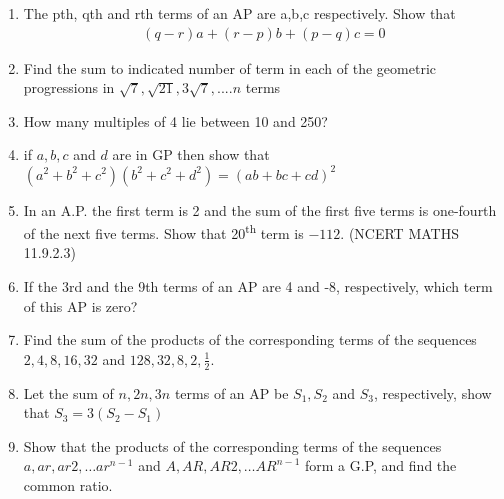 \begin{enumerate}[label=\thesection.\arabic*,ref=\thesection.\theenumi]
\item The pth, qth and rth terms of an AP are a,b,c respectively. Show that
\begin{align*} (q-r)a + (r-p)b +(p-q)c =0 \end{align*}
\solution

\pagebreak

\item Find the sum to indicated number of term in each of the geometric progressions in $\sqrt{7} ,\sqrt{21} , 3\sqrt{7}, ....n$ terms\\
\solution


\item How many multiples of 4 lie between 10 and 250?\\
\solution

\pagebreak

\item if $a,b,c$ and $d$ are in GP then show that $(a^{2}+b^{2}+c^{2})(b^{2}+c^{2}+d^{2})=(ab+bc+cd)^{2}$\\
\solution
\pagebreak

\item In an A.P. the first term is 2 and the sum of the first five terms is one-fourth of the next five terms. Show that 20\textsuperscript{th} term is $-112$. \hfill(NCERT MATHS 11.9.2.3)\\
\solution

\pagebreak
\item If the 3rd and the 9th terms of an AP are 4 and -8, respectively, which term of this AP is zero? \\
\solution

\pagebreak
\item Find the sum of the products of the corresponding terms of the sequences $2, 4, 8, 16, 32$ and $128, 32, 8, 2, \frac{1}{2}$.
\solution

\pagebreak

\item Let the sum of $n,2n,3n$ terms of an AP be $S_1,S_2$ and $S_3$, respectively, show that $S_3=3(S_2-S_1)$\\
\solution

\pagebreak

\item Show that the products of the corresponding terms of the sequences $a, ar, ar2, \ldots ar^{n-1}$ and $A, AR, AR2, \ldots AR^{n-1}$ form a G.P, and find the common ratio.
\solution

\pagebreak


\end{enumerate}
